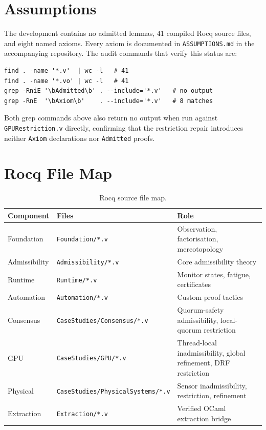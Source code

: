 \documentclass[a4paper,11pt]{article}
\begin{document}
\appendix

\section{Assumptions}
\label{app:assumptions}

The development contains no admitted lemmas, 41 compiled Rocq source files, and
eight named axioms. Every axiom is documented in \texttt{ASSUMPTIONS.md} in the
accompanying repository. The audit commands that verify this status are:

\begin{verbatim}
find . -name '*.v'  | wc -l   # 41
find . -name '*.vo' | wc -l   # 41
grep -RniE '\bAdmitted\b' . --include='*.v'   # no output
grep -RnE  '\bAxiom\b'    . --include='*.v'   # 8 matches
\end{verbatim}

\noindent Both grep commands above also return no output when run against
\texttt{GPURestriction.v} directly, confirming that the restriction repair
introduces neither \texttt{Axiom} declarations nor \texttt{Admitted} proofs.

\section{Rocq File Map}
\label{app:filemap}

\begin{table}[h]
\centering
\small
\begin{tabular}{p{2.1cm}p{4.0cm}p{4.5cm}}
\toprule
Component & Files & Role \\
\midrule
Foundation & \texttt{Foundation/*.v} & Observation, factorisation, mereotopology \\
Admissibility & \texttt{Admissibility/*.v} & Core admissibility theory \\
Runtime & \texttt{Runtime/*.v} & Monitor states, fatigue, certificates \\
Automation & \texttt{Automation/*.v} & Custom proof tactics \\
Consensus & \texttt{CaseStudies/\allowbreak{}Consensus/*.v} & Quorum-safety admissibility, local-quorum restriction \\
GPU & \texttt{CaseStudies/GPU/*.v} & Thread-local inadmissibility, global refinement, DRF restriction \\
Physical & \texttt{CaseStudies/\allowbreak{}PhysicalSystems/*.v} & Sensor inadmissibility, restriction, refinement \\
Extraction & \texttt{Extraction/*.v} & Verified OCaml extraction bridge \\
\bottomrule
\end{tabular}
\caption{Rocq source file map.}
\label{tab:filemap}
\end{table}
\end{document}
